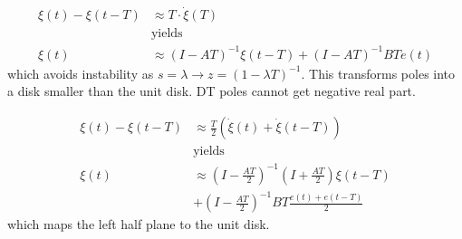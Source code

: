 \noindent\begin{align*}
    \xi(t)-\xi(t-T) & \approx T\cdot\dot{\xi}(T)                       \\
                    & \text{yields}                                    \\
    \xi(t)          & \approx{(I-AT)}^{-1}\xi(t-T)+{(I-AT)}^{-1}BTe(t)
\end{align*}
which avoids instability as $s=\lambda \rightarrow z={(1-\lambda T)}^{-1}$. This transforms poles into a disk smaller than the unit disk. DT poles cannot get negative real part.\\

\noindent\begin{align*}
    \xi(t)-\xi(t-T) & \approx \frac T2\left(\dot{\xi}(t)+\dot{\xi}(t-T)\right) \\
                    & \text{yields}                                            \\
    \xi(t)          & \approx{\left(I-\frac{AT}{2}\right)}^{-1}\left(I+\frac{AT}{2}\right)\xi(t-T)                   \\
                    & +{\left(I-\frac{AT}{2}\right)}^{-1}BT\frac{e(t)+e(t-T)}2
\end{align*}
which maps the left half plane to the unit disk.